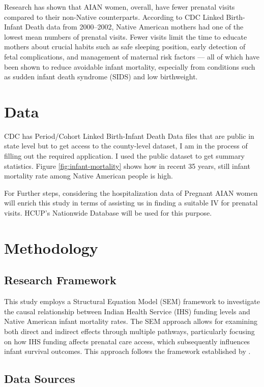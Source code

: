 \documentclass[12pt]{article}
\begin{document}
Research has shown that AIAN women, overall, have fewer prenatal visits
compared to their non-Native counterparts. According to CDC Linked
Birth-Infant Death data from 2000--2002, Native American mothers had one
of the lowest mean numbers of prenatal visits. Fewer visits limit the
time to educate mothers about crucial habits such as safe sleeping
position, early detection of fetal complications, and management of
maternal risk factors --- all of which have been shown to reduce
avoidable infant mortality, especially from conditions such as sudden
infant death syndrome (SIDS) and low birthweight.

\section{Data}

CDC has Period/Cohort Linked Birth-Infant Death Data files that are
public in state level but to get access to the county-level dataset, I
am in the process of filling out the required application. I used the
public dataset to get summary statistics. Figure \ref{fig:infant-mortality} shows how in
recent 35 years, still infant mortality rate among Native American
people is high.

For Further steps, considering the hospitalization data of Pregnant AIAN
women will enrich this study in terms of assisting us in finding a
suitable IV for prenatal visits. HCUP's Nationwide Database will be used
for this purpose.

\section{Methodology}

\subsection{Research Framework}

This study employs a Structural Equation Model (SEM) framework to investigate the causal relationship between Indian Health Service (IHS) funding levels and Native American infant mortality rates. The SEM approach allows for examining both direct and indirect effects through multiple pathways, particularly focusing on how IHS funding affects prenatal care access, which subsequently influences infant survival outcomes. This approach follows the framework established by \citet{derso2023}.

\subsection{Data Sources}
\end{document}
